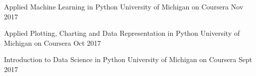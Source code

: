 

\begin{cvhonors}

  \cvhonor
    {Applied Machine Learning in Python} %
    {University of Michigan on Coursera} %
    {} %
    {Nov 2017} %

  \cvhonor
    {Applied Plotting, Charting and Data Representation in Python} %
    {University of Michigan on Coursera} %
    {} %
    {Oct 2017} %

  \cvhonor
    {Introduction to Data Science in Python} %
    {University of Michigan on Coursera} %
    {} %
    {Sept 2017} %
\end{cvhonors}
